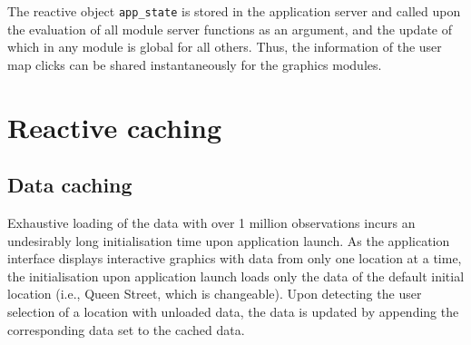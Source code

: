 \documentclass{aucklandthesis}
\begin{document}
\begin{Shaded}
\begin{Highlighting}[]
\StringTok{ }
\StringTok{ }
\NormalTok{  \}}
\NormalTok{\}}
\end{Highlighting}
\end{Shaded}

The reactive object \texttt{app\_state} is stored in the application server and called upon the evaluation of all module server functions as an argument, and the update of which in any module is global for all others. Thus, the information of the user map clicks can be shared instantaneously for the graphics modules.

\hypertarget{reactive-caching}{%
\section{Reactive caching}\label{reactive-caching}}

\hypertarget{data-caching}{%
\subsection{Data caching}\label{data-caching}}

Exhaustive loading of the data with over 1 million observations incurs an undesirably long initialisation time upon application launch. As the application interface displays interactive graphics with data from only one location at a time, the initialisation upon application launch loads only the data of the default initial location (i.e., Queen Street, which is changeable). Upon detecting the user selection of a location with unloaded data, the data is updated by appending the corresponding data set to the cached data.
\end{document}
